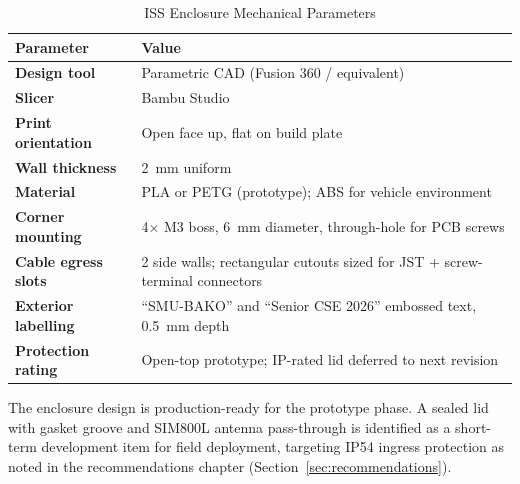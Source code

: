 \begin{table}[H]
\centering
\caption{ISS Enclosure Mechanical Parameters}\label{tab:case-features}
\begin{tabular}{>{\bfseries}p{4.2cm} p{8.5cm}}
\toprule
Parameter & Value \\
\midrule
Design tool        & Parametric CAD (Fusion 360 / equivalent) \\
Slicer             & Bambu Studio \\
Print orientation  & Open face up, flat on build plate \\
Wall thickness     & 2~mm uniform \\
Material           & PLA or PETG (prototype); ABS for vehicle environment \\
Corner mounting    & 4$\times$ M3 boss, 6~mm diameter, through-hole for PCB screws \\
Cable egress slots & 2 side walls; rectangular cutouts sized for JST + screw-terminal connectors \\
Exterior labelling & ``SMU-BAKO'' and ``Senior CSE 2026'' embossed text, 0.5~mm depth \\
Protection rating  & Open-top prototype; IP-rated lid deferred to next revision \\
\bottomrule
\end{tabular}
\end{table}

The enclosure design is production-ready for the prototype phase. A sealed lid with gasket groove and SIM800L antenna pass-through is identified as a short-term development item for field deployment, targeting IP54 ingress protection as noted in the recommendations chapter (Section~\ref{sec:recommendations}).
